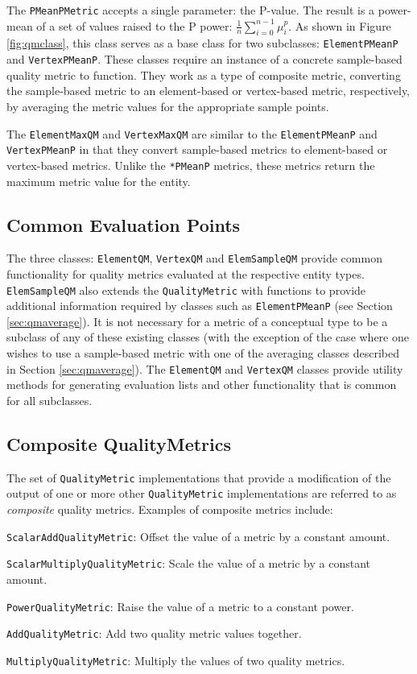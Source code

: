 \documentclass{article}
\begin{document}
The \texttt{PMeanPMetric} accepts a single parameter: the P-value.  The result is a power-mean of a set of values raised to the P power: $\frac{1}{n}\sum_{i=0}^{n-1}\mu_i^p$.  As shown in Figure \ref{fig:qmclass}, this class serves as a base class for two subclasses: \texttt{ElementPMeanP} and \texttt{VertexPMeanP}.  These classes require an instance of a concrete sample-based quality metric to function.  They work as a type of composite metric, converting the sample-based metric to an element-based or vertex-based metric, respectively, by averaging the metric values for the appropriate sample points.

The \texttt{ElementMaxQM} and \texttt{VertexMaxQM} are similar to the \texttt{ElementPMeanP} and \texttt{VertexPMeanP} in that they convert sample-based metrics to element-based or vertex-based metrics.  Unlike the \texttt{*PMeanP} metrics, these metrics return the maximum metric value for the entity.

\subsection{Common Evaluation Points}

The three classes: \texttt{ElementQM}, \texttt{VertexQM} and \texttt{ElemSampleQM} provide common functionality for quality metrics evaluated at the respective entity types.  \texttt{ElemSampleQM} also extends the \texttt{QualityMetric} with functions to provide additional information required by classes such as \texttt{ElementPMeanP} (see Section \ref{sec:qmaverage}).  It is not necessary for a metric of a conceptual type to be a subclass of any of these existing classes (with the exception of the case where one wishes to use a sample-based metric with one of the averaging classes described in Section \ref{sec:qmaverage}).  The \texttt{ElementQM} and \texttt{VertexQM} classes provide utility methods for generating evaluation lists and other functionality that is common for all subclasses.

\subsection{Composite QualityMetrics}

The set of \texttt{QualityMetric} implementations that provide a modification of the output of one or more other \texttt{QualityMetric} implementations are referred to as \emph{composite} quality metrics.  Examples of composite metrics include:
\begin{description}
\item{\texttt{ScalarAddQualityMetric}}: Offset the value of a metric by a constant amount.
\item{\texttt{ScalarMultiplyQualityMetric}}: Scale the value of a metric by a constant amount.
\item{\texttt{PowerQualityMetric}}: Raise the value of a metric to a constant power.
\item{\texttt{AddQualityMetric}}: Add two quality metric values together.
\item{\texttt{MultiplyQualityMetric}}: Multiply the values of two quality metrics.
\end{description}
\end{document}
